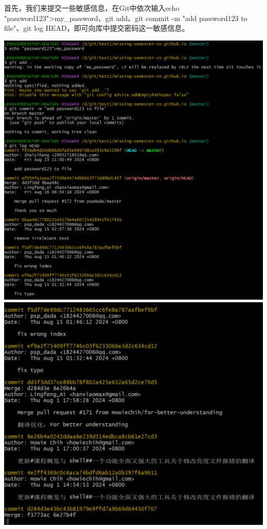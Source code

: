 \documentclass[UTF8,a4paper]{ctexart}
\begin{document}
\begin{sloppypar}
	首先，我们来提交一些敏感信息，在Git中依次输入echo "password123">my\_password、git add、git commit -m "add password123 to file"、git log HEAD，即可向库中提交密码这一敏感信息。
	
	\includegraphics[width = 16cm]{7}
	\includegraphics[width = 16cm]{8}
	

\end{sloppypar}
\end{document}
